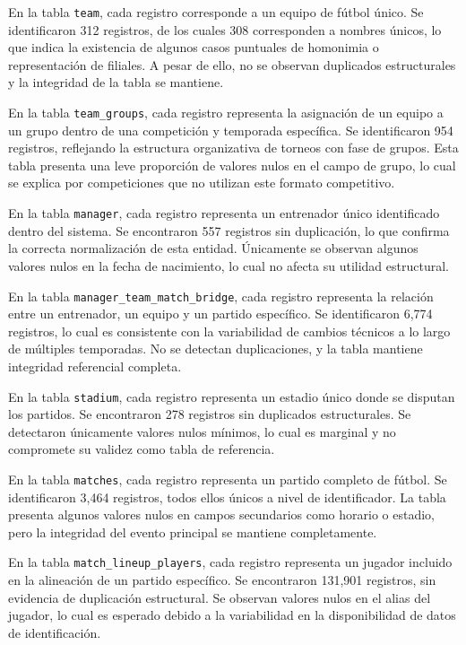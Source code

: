 \documentclass[12pt,a4paper]{article}
\begin{document}
En la tabla \texttt{team}, cada registro corresponde a un equipo de fútbol único. Se identificaron 312 registros, de los cuales 308 corresponden a nombres únicos, lo que indica la existencia de algunos casos puntuales de homonimia o representación de filiales. A pesar de ello, no se observan duplicados estructurales y la integridad de la tabla se mantiene.

En la tabla \texttt{team\_groups}, cada registro representa la asignación de un equipo a un grupo dentro de una competición y temporada específica. Se identificaron 954 registros, reflejando la estructura organizativa de torneos con fase de grupos. Esta tabla presenta una leve proporción de valores nulos en el campo de grupo, lo cual se explica por competiciones que no utilizan este formato competitivo.

En la tabla \texttt{manager}, cada registro representa un entrenador único identificado dentro del sistema. Se encontraron 557 registros sin duplicación, lo que confirma la correcta normalización de esta entidad. Únicamente se observan algunos valores nulos en la fecha de nacimiento, lo cual no afecta su utilidad estructural.

En la tabla \texttt{manager\_team\_match\_bridge}, cada registro representa la relación entre un entrenador, un equipo y un partido específico. Se identificaron 6,774 registros, lo cual es consistente con la variabilidad de cambios técnicos a lo largo de múltiples temporadas. No se detectan duplicaciones, y la tabla mantiene integridad referencial completa.

En la tabla \texttt{stadium}, cada registro representa un estadio único donde se disputan los partidos. Se encontraron 278 registros sin duplicados estructurales. Se detectaron únicamente valores nulos mínimos, lo cual es marginal y no compromete su validez como tabla de referencia.

En la tabla \texttt{matches}, cada registro representa un partido completo de fútbol. Se identificaron 3,464 registros, todos ellos únicos a nivel de identificador. La tabla presenta algunos valores nulos en campos secundarios como horario o estadio, pero la integridad del evento principal se mantiene completamente.

En la tabla \texttt{match\_lineup\_players}, cada registro representa un jugador incluido en la alineación de un partido específico. Se encontraron 131,901 registros, sin evidencia de duplicación estructural. Se observan valores nulos en el alias del jugador, lo cual es esperado debido a la variabilidad en la disponibilidad de datos de identificación.
\end{document}

